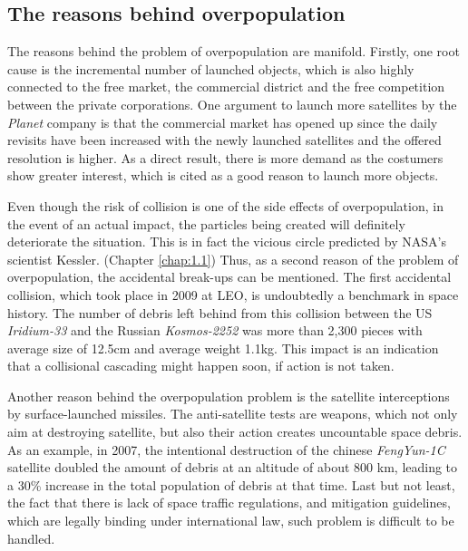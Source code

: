 \subsection{The reasons behind overpopulation}
\bigskip
The reasons behind the problem of overpopulation are manifold. Firstly, one root cause is the incremental number of launched objects, which is also highly connected to the free market, the commercial district and the free competition between the private corporations. %
One argument to launch more satellites by the \textit{Planet} company is that the commercial market has opened up since the daily revisits have been increased with the newly launched satellites and the offered resolution is higher. As a direct result, there is more demand as the costumers show greater interest, which is cited as a good reason to launch more objects. \cite{CNBC}

Even though the risk of collision is one of the side effects of overpopulation, in the event of an actual impact, the particles being created will definitely deteriorate the situation. This is in fact the vicious circle predicted by NASA's scientist Kessler. (Chapter \ref{chap:1.1}) Thus, as a second reason of the problem of overpopulation, the accidental break-ups can be mentioned. The first accidental collision, which took place in 2009 at LEO, is undoubtedly a benchmark in space history. The number of debris left behind from this collision between the US \textit{Iridium-33} and the Russian \textit{Kosmos-2252} was more than 2,300 pieces with average size of 12.5cm and average weight 1.1kg. \cite{Kelso 2009} This impact is an indication that a collisional cascading might happen soon, if action is not taken.

Another reason behind the overpopulation problem is the satellite interceptions by surface-launched missiles. The anti-satellite tests are weapons, which not only aim at destroying satellite, but also their action creates uncountable space debris. As an example, in 2007, the intentional destruction of the chinese \textit{FengYun-1C} satellite doubled the amount of debris at an altitude of about 800 km, leading to a 30\% increase in the total population of debris at that time. \cite{Anti-satellite} Last but not least, the fact that there is lack of space traffic regulations, and mitigation guidelines, which are legally binding under international law, such problem is difficult to be handled.

